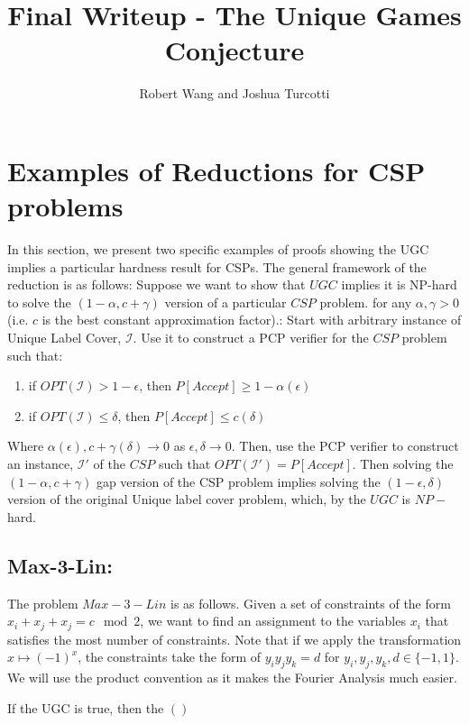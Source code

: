 \documentclass{article}
\title{Final Writeup - The Unique Games Conjecture}
\author{Robert Wang and Joshua Turcotti}
\begin{document}
\maketitle
\section*{Examples of Reductions for CSP problems}
In this section, we present two specific examples of proofs showing the UGC implies a particular hardness result for CSPs. The general framework of the reduction is as follows: Suppose we want to show that $UGC$ implies it is NP-hard to solve the $(1-\alpha, c+\gamma)$ version of a particular $CSP$ problem. for any $\alpha, \gamma > 0$ (i.e. $c$ is the best constant approximation factor).: Start with arbitrary instance of Unique Label Cover, $\mathcal{I}$. Use it to construct a PCP verifier for the $CSP$ problem such that:
\begin{enumerate}[1)]
            \item if $OPT(\mathcal{I}) > 1-\epsilon$, then $P[Accept] \geq 1-\alpha(\epsilon)$
            \item if $OPT(\mathcal{I}) \leq \delta$, then $P[Accept] \leq c(\delta)$
\end{enumerate}
Where $\alpha(\epsilon), c+\gamma(\delta)\rightarrow 0$ as $\epsilon,\delta\rightarrow 0$. Then, use the PCP verifier to construct an instance, $\mathcal{I}'$ of the $CSP$ such that $OPT(\mathcal{I}') = P[Accept]$. Then solving the $(1-\alpha, c+\gamma)$ gap version of the CSP problem implies solving the $(1-\epsilon, \delta)$ version of the original Unique label cover problem, which, by the $UGC$ is $NP-$hard.
\subsection*{Max-3-Lin:}
The problem $Max-3-Lin$ is as follows. Given a set of constraints of the form $x_i + x_j + x_j = c \mod 2$, we want to find an assignment to the variables $x_i$ that satisfies the most number of constraints. Note that if we apply the transformation $x\mapsto (-1)^x$, the constraints take the form of $y_iy_jy_k = d$ for $y_i,y_j,y_k,d\in \{-1,1\}$. We will use the product convention as it makes the Fourier Analysis much easier.
\begin{theorem}
If the UGC is true, then the $()$
\end{theorem}
\end{document}
